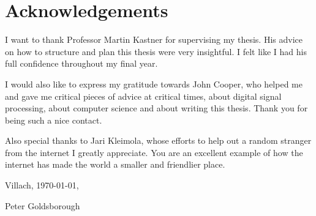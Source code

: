 \chapter*{Acknowledgements}

I want to thank Professor Martin Kastner for supervising my thesis. His advice on how to structure and plan this thesis were very insightful. I felt like I had his full confidence throughout my final year. \vspace{\baselineskip}

I would also like to express my gratitude towards John Cooper, who helped me and gave me critical pieces of advice at critical times, about digital signal processing, about computer science and about writing this thesis. Thank you for being such a nice contact.
\vspace{\baselineskip}

Also special thanks to Jari Kleimola, whose efforts to help out a random stranger from the internet I greatly appreciate. You are an excellent example of how the internet has made the world a smaller and friendlier place.
\vspace{\baselineskip}

\noindent Villach, \today,
\vspace{\baselineskip}

\noindent Peter Goldsborough
